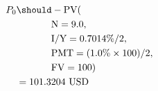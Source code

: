 \begin{align*}
P_{0}&\should-\text{PV}(\\
	&\hspace{.5in}\text{N}=9.0,\\
	&\hspace{.5in}\text{I/Y}=0.7014\%/2,\\
	&\hspace{.5in}\text{PMT}=(1.0\%\times 100)/2,\\
	&\hspace{.5in}\text{FV}=100)\\
	&=101.3204\text{ USD}
\end{align*}
